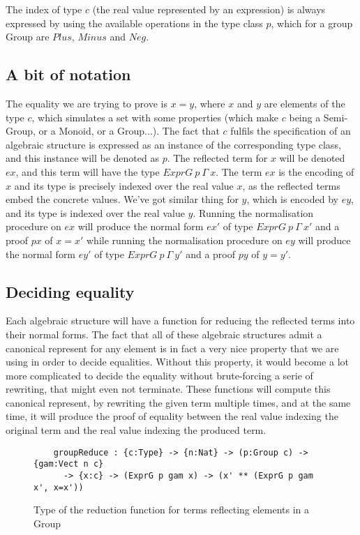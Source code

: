The index of type $c$ (the real value represented by an expression) is always expressed by using the available operations in the type class $p$, which for a group Group are $Plus$, $Minus$ and $Neg$.

	\subsection {A bit of notation}
The equality we are trying to prove is $x=y$, where $x$ and $y$ are elements of the type $c$, which  simulates a set with some properties (which make $c$ being a Semi-Group, or a Monoid, or a Group...). The fact that $c$ fulfils the specification of an algebraic structure is expressed as an instance of the corresponding type class, and this instance will be denoted as $p$.
The reflected term for $x$ will be denoted $ex$, and this term will have the type $ExprG\ p\ \Gamma\ x$. The term $ex$ is the encoding of $x$ and its type is precisely indexed over the real value $x$, as the reflected terms embed the concrete values.
We've got similar thing for $y$, which is encoded by $ey$, and its type is indexed over the real value $y$.
Running the normalisation procedure on $ex$ will produce the normal form $ex'$ of type $ExprG\ p\ \Gamma\ x'$ and a proof $px$ of $x=x'$ while running the normalisation procedure on $ey$ will produce the normal form $ey'$ of type $ExprG\ p\ \Gamma\ y'$ and a proof $py$ of $y=y'$.

	\subsection {Deciding equality}
	
Each algebraic structure will have a function for reducing the reflected terms into their normal forms. The fact that all of these algebraic structures admit a canonical represent for any element is in fact a very nice property that we are using in order to decide equalities. Without this property, it would become a lot more complicated to decide the equality without brute-forcing a serie of rewriting, that might even not terminate.
These functions will compute this canonical represent, by rewriting the given term multiple times, and at the same time, it will produce the proof of equality between the real value indexing the original term and the real value indexing the produced term.

\begin{figure}[H]
\figrule
\begin{center}
\begin{verbatim}
	groupReduce : {c:Type} -> {n:Nat} -> (p:Group c) -> {gam:Vect n c} 
	  -> {x:c} -> (ExprG p gam x) -> (x' ** (ExprG p gam x', x=x'))
\end{verbatim}
\end{center}
\caption{Type of the reduction function for terms reflecting elements in a Group}
\figrule
\end{figure}

